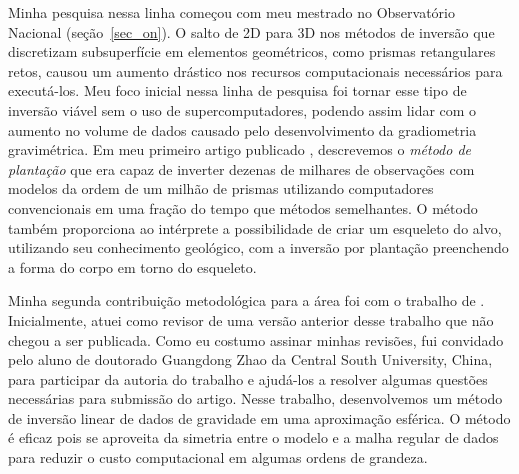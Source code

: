 \documentclass[12pt,a4paper,oneside]{book}
\newcommand{\ON}{Observatório Nacional}
\begin{document}
Minha pesquisa nessa linha começou com meu mestrado no \ON{}
(seção~\ref{sec_on}).
O salto de 2D para 3D nos métodos de inversão que discretizam subsuperfície em
elementos geométricos, como prismas retangulares retos, causou um aumento
drástico nos recursos computacionais necessários para executá-los.
Meu foco inicial nessa linha de pesquisa foi tornar esse tipo de inversão
viável sem o uso de supercomputadores, podendo assim lidar com o aumento no
volume de dados causado pelo desenvolvimento da gradiometria gravimétrica.
Em meu primeiro artigo publicado \citep{Uieda2012}, descrevemos o
\textit{método de plantação} que era capaz de inverter dezenas de milhares de
observações com modelos da ordem de um milhão de prismas utilizando
computadores convencionais em uma fração do tempo que métodos semelhantes.
O método também proporciona ao intérprete a possibilidade de criar um esqueleto
do alvo, utilizando seu conhecimento geológico, com a inversão por plantação
preenchendo a forma do corpo em torno do esqueleto.

Minha segunda contribuição metodológica para a área foi com o trabalho de
\citet{Zhao2019}.
Inicialmente, atuei como revisor de uma versão anterior desse trabalho que não
chegou a ser publicada.
Como eu costumo assinar minhas revisões, fui convidado pelo aluno de doutorado
Guangdong Zhao da Central South University, China, para participar da autoria
do trabalho e ajudá-los a resolver algumas questões necessárias para submissão
do artigo.
Nesse trabalho, desenvolvemos um método de inversão linear de dados de
gravidade em uma aproximação esférica.
O método é eficaz pois se aproveita da simetria entre o modelo e a malha regular
de dados para reduzir o custo computacional em algumas ordens de grandeza.
\end{document}
